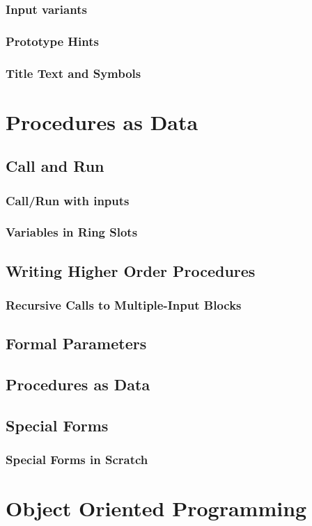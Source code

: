 \documentclass{report}
\begin{document}
\subsection{Input variants}
\subsection{Prototype Hints}
\subsection{Title Text and Symbols}
\chapter{Procedures as Data}
\section{Call and Run}
\subsection{Call/Run with inputs}
\subsection{Variables in Ring Slots}
\section{Writing Higher Order Procedures}
\subsection{Recursive Calls to Multiple-Input Blocks}
\section{Formal Parameters}
\section{Procedures as Data}
\section{Special Forms}
\subsection{Special Forms in Scratch}
\chapter{Object Oriented Programming}
\end{document}
